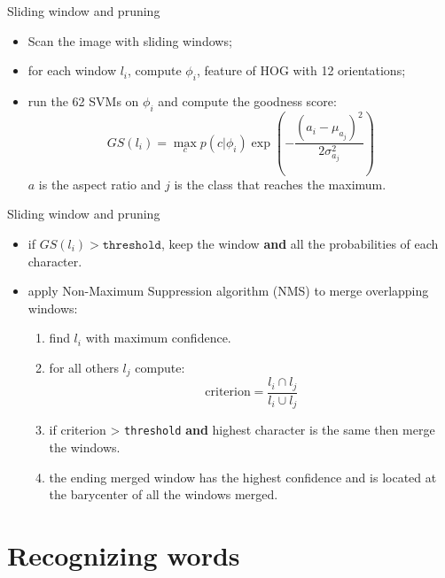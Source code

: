 \documentclass[handout]{beamer}
\begin{document}
\begin{frame}{Sliding window and pruning}
\begin{itemize}
	\item Scan the image with sliding windows;
	\item for each window $l_i$, compute $\phi_i$, feature of HOG with 12 orientations;
	\item run the 62 SVMs on $\phi_i$ and compute the goodness score:
	\begin{equation}
	GS(l_i) = \max_c p(c|\phi_i) \exp\left( - \frac{(a_i - \mu_{a_j})^2}{2\sigma_{a_j}^2} \right)
	\label{eq:}
	\end{equation}
	$a$ is the aspect ratio and $j$ is the class that reaches the maximum.
\end{itemize}
\end{frame}

\begin{frame}{Sliding window and pruning}
\begin{itemize}
	\item if $GS(l_i) > \texttt{threshold}$, keep the window \textbf{and} all the probabilities of each character.
	\item apply Non-Maximum Suppression algorithm (NMS) to merge overlapping windows:
	\begin{enumerate}
		\item find $l_i$ with maximum confidence.
		\item for all others $l_j$ compute:
		\begin{equation}
		\text{criterion} = \frac{l_i \cap l_j}{l_i \cup l_j}
		\label{eq:}
		\end{equation}
		\item if criterion > \texttt{threshold} \textbf{and} highest character is the same then merge the windows.
		\item the ending merged window has the highest confidence and is located at the barycenter of all the windows merged.
	\end{enumerate}
\end{itemize}
\end{frame}


\section{Recognizing words}
\end{document}
